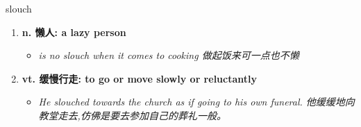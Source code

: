 
\begin{frame}
{\huge slouch}
\begin{center}
\begin{enumerate}\Large
  \item \textbf{n. 懒人: a lazy person}
  \begin{itemize}
    \item \em{\Large{is no slouch when it comes to cooking 做起饭来可一点也不懒}}
  \end{itemize}
  \item \textbf{vt. 缓慢行走: to go or move slowly or reluctantly}
  \begin{itemize}
    \item \em{\Large{He slouched towards the church as if going to his own funeral. 他缓缓地向教堂走去,仿佛是要去参加自己的葬礼一般。}}
  \end{itemize}
\end{enumerate}
\end{center}
\end{frame}
